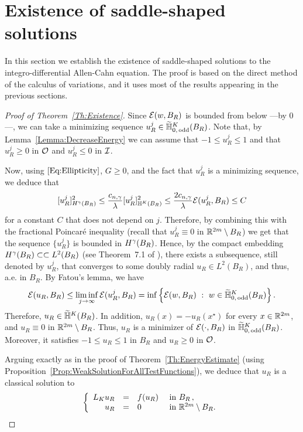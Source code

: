 \section{Existence of saddle-shaped solutions}
\label{Sec:Existence}


In this section we establish the existence of saddle-shaped solutions to the integro-differential Allen-Cahn equation. The proof is based on the direct method of the calculus of variations, and it uses most of the results appearing in the previous sections.

\begin{proof}[Proof of Theorem~\ref{Th:Existence}]
Since $\mathcal{E}(w,B_R)$ is bounded from below ---by $0$---, we can take a minimizing sequence $u_R^j\in \widetilde{\mathbb{H}}^K_{0, \,\mathrm{odd}}(B_R)$. Note that, by Lemma~\ref{Lemma:DecreaseEnergy} we can assume that $-1 \leq u_R^j \leq 1$ and that $u_R^j \geq 0$ in $\mathcal{O}$ and  $u_R^j \leq 0$ in $\mathcal{I}$. 

Now, using $\eqref{Eq:Ellipticity}$, $G\geq 0$, and the fact that $u_R^j$ is a minimizing sequence, we deduce that 
$$
[u_R^j]^2_{H^\gamma(B_R)} \leq \dfrac{c_{n,\gamma}}{\lambda}  [u_R^j]^2_{\mathbb{H}^K(B_R)}\leq \dfrac{2 c_{n,\gamma}}{\lambda}\mathcal{E}(u_R^j,B_R) \leq C
$$
for a constant $C$ that does not depend on $j$. Therefore, by combining this with the fractional Poincaré inequality (recall that $u_R^j \equiv 0$ in $\mathbb{R}^{2m}\setminus B_R$) we get that the sequence $\{u_R^j\}$ is bounded in $H^\gamma(B_R)$. Hence, by the compact embedding $H^\gamma(B_R) \subset \subset L^2(B_R)$ (see Theorem~7.1 of \cite{HitchhikerGuide}), there exists a subsequence, still denoted by $u_R^j$,  that converges to some doubly radial $u_R \in L^2(B_R)$, and thus, a.e. in $B_R$. By Fatou's lemma, we have
$$
\mathcal{E}(u_R, B_R)
\leq \liminf_{j\to \infty} \mathcal{E}(u_R^j, B_R) = \inf \left \{ \mathcal{E}(w, B_R) \ : \ w \in \widetilde{\mathbb{H}}^K_{0, \,\mathrm{odd}}(B_R) \right \}.
$$
Therefore, $u_R \in \widetilde{\mathbb{H}}^K(B_R)$. In addition, $u_R(x) = - u_R(x^\star)$ for every $x\in \mathbb{R}^{2m}$, and $u_R \equiv 0 $ in $\mathbb{R}^{2m} \setminus B_R$. Thus, $u_R$ is a minimizer of $\mathcal{E}(\cdot, B_R)$ in $\widetilde{\mathbb{H}}^K_{0, \,\mathrm{odd}}(B_R)$. Moreover, it satisfies $-1\leq u_R \leq 1$ in $B_R$ and $u_R\geq 0$ in $\mathcal{O}$.

Arguing exactly as in the proof of Theorem~\ref{Th:EnergyEstimate} (using Proposition~\ref{Prop:WeakSolutionForAllTestFunctions}), we deduce that $u_R$ is a classical solution to
\begin{equation*}
	\left\{\begin{array}{rcll}
	L_K  u_R &=& f(u_R) & \textrm{ in } B_R\,,\\
	u_R &=& 0 & \textrm{ in }\mathbb{R}^{2m} \setminus B_R.
	\end{array} \right.
\end{equation*}



\end{proof}
